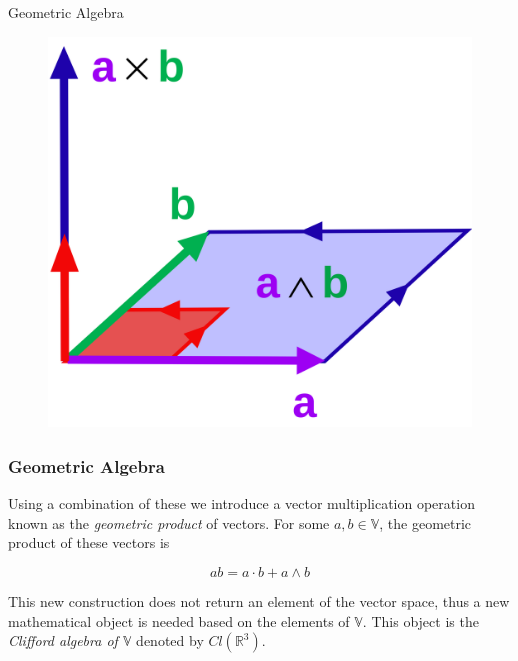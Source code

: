 \documentclass{beamer}
\begin{document}
\begin{frame}{Geometric Algebra}

\begin{figure}
	\centering
	\includegraphics[scale=0.1]{Figures/Exterior_calc_cross_product.svg.png}
\end{figure}

\end{frame}

\begin{frame}
\frametitle{Geometric Algebra}

Using a combination of these we introduce a vector multiplication operation known as the \emph{geometric product} of vectors. For some  $a, b \in \mathbb{V}$, the geometric product of these vectors is

\begin{equation}
	ab = a \cdot b + a \wedge b
\end{equation}

\pause

This new construction does not return an element of the vector space, thus a new mathematical object is needed based on the elements of $\mathbb{V}$. \pause This object is the \emph{Clifford algebra of $\mathbb{V}$} denoted by $Cl(\mathbb{R}^3)$.

\end{frame}
\end{document}
